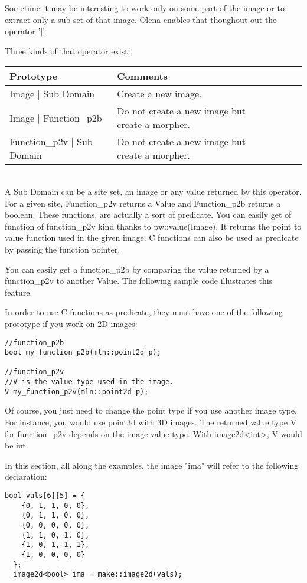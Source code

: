 \documentclass{report}
\begin{document}
Sometime it may be interesting to work only on some part of the image or to
extract only a sub set of that image. Olena enables that thoughout out the
operator '$|$'.

Three kinds of that operator exist:\\

\begin{tabular}{|l|l|l|l|p{4cm}|}
\hline
Prototype & Comments \\ \hline

Image $|$ Sub Domain & Create a new image.\\ \hline
Image $|$ Function\_p2b & Do not create a new image but create a morpher.\\
\hline
Function\_p2v $|$ Sub Domain & Do not create a new image but create a morpher.\\
\hline
\end{tabular} \\

A Sub Domain can be a site set, an image or any value returned by this
operator.
For a given site, Function\_p2v returns a Value and Function\_p2b returns a
boolean. These functions. are actually a sort of predicate. You can easily get
of function of function\_p2v kind thanks to pw::value(Image). It returns the
point to value function used in the given image. C functions can also be used as
predicate by passing the function pointer.

You can easily get a function\_p2b by comparing the value returned 
by a function\_p2v to another Value.
The following sample code illustrates this feature.

In order to use C functions as predicate, they must have one of the following
prototype if you work on 2D images:
\begin{lstlisting}[frame=single]
//function_p2b
bool my_function_p2b(mln::point2d p);

//function_p2v
//V is the value type used in the image.
V my_function_p2v(mln::point2d p);
\end{lstlisting}
Of course, you just need to change the point type if you use another image
type. For instance, you would use point3d with 3D images.
The returned value type V for function\_p2v depends on the image value type.
With image2d<int>, V would be int.

In this section, all along the examples, the image "ima" will refer to the
following declaration:
\begin{lstlisting}[frame=single]
  bool vals[6][5] = {
    {0, 1, 1, 0, 0},
    {0, 1, 1, 0, 0},
    {0, 0, 0, 0, 0},
    {1, 1, 0, 1, 0},
    {1, 0, 1, 1, 1},
    {1, 0, 0, 0, 0}
  };
  image2d<bool> ima = make::image2d(vals);
\end{lstlisting}
\end{document}
